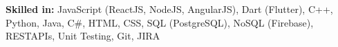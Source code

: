 \textbf{Skilled in:} JavaScript (ReactJS, NodeJS, AngularJS), Dart (Flutter), C++, Python, Java, C\#, HTML, CSS, SQL (PostgreSQL), NoSQL (Firebase), RESTAPIs, Unit Testing, Git, JIRA
